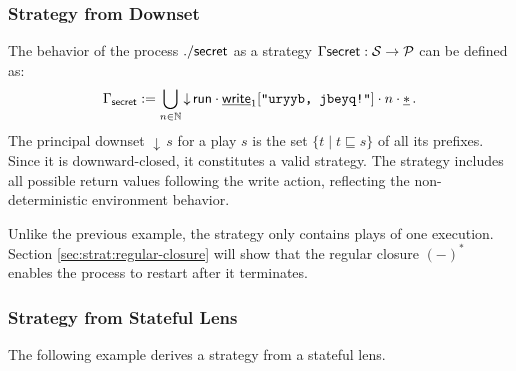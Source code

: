 \subsubsection{Strategy from Downset}

The behavior of the process $ \mathsf{./secret} $
as a strategy $\Gamma \mathsf{secret}  : \mathcal{S} \rightarrow \mathcal{P}$
can be defined as:
\[
  \Gamma_{ \mathsf{secret} } :=
  \bigcup_{n \in \mathbb{N}}
  {\downarrow} \,
   \mathsf{run}  \cdot \underline{ \mathsf{write} }_1[\texttt{"uryyb, jbeyq!"}]
  \cdot n \cdot \underline{*}
  \,.
\]
The principal downset ${\downarrow}\, s$ for a play $s$
is the set $\{t \mid t \sqsubseteq s\}$ of all its prefixes.
Since it is downward-closed, it constitutes a valid strategy.
The strategy includes all possible return values
following the write action,
reflecting the non-deterministic environment behavior.

Unlike the previous example,
the strategy only contains plays of one execution.
Section \ref{sec:strat:regular-closure} will show
that the regular closure $(-)^*$
enables the process to restart after it terminates.


\subsubsection{Strategy from Stateful Lens}

The following example
derives a strategy from a stateful lens.

